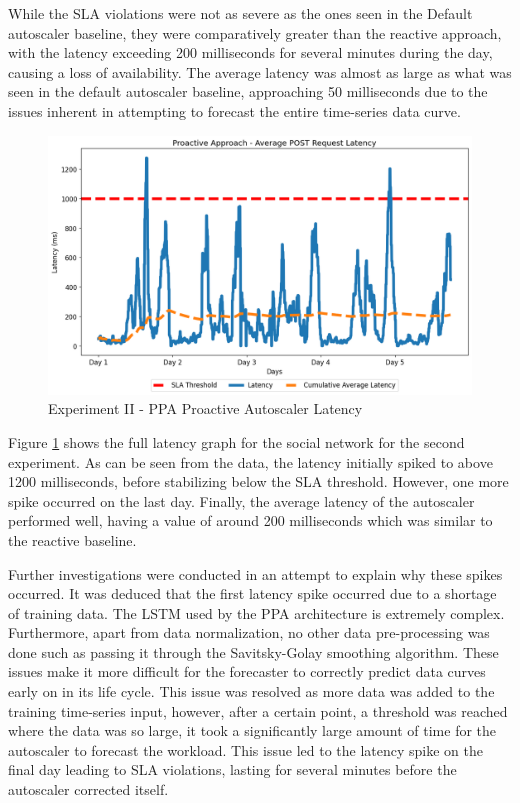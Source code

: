 While the SLA violations were not as severe as the ones seen in the Default autoscaler baseline, they were comparatively greater than the reactive approach, with the latency exceeding 200 milliseconds for several minutes during the day, causing a loss of availability. The average latency was almost as large as what was seen in the default autoscaler baseline, approaching 50 milliseconds due to the issues inherent in attempting to forecast the entire time-series data curve.\par

\begin{figure}[htb]
    \centering
    \caption{Experiment II - PPA Proactive Autoscaler Latency}
    \label{fig:exp2-proactive-k8s}
    \includegraphics[width=0.6\linewidth]{Figures/Compose-Post-Proactive-Latency.png}
\end{figure}

Figure \ref{fig:exp2-proactive-k8s} shows the full latency graph for the social network for the second experiment. As can be seen from the data, the latency initially spiked to above 1200 milliseconds, before stabilizing below the SLA threshold. However, one more spike occurred on the last day. Finally, the average latency of the autoscaler performed well, having a value of around 200 milliseconds which was similar to the reactive baseline.\par

Further investigations were conducted in an attempt to explain why these spikes occurred. It was deduced that the first latency spike occurred due to a shortage of training data. The LSTM used by the PPA architecture is extremely complex. Furthermore, apart from data normalization, no other data pre-processing was done such as passing it through the Savitsky-Golay smoothing algorithm. These issues make it more difficult for the forecaster to correctly predict data curves early on in its life cycle. This issue was resolved as more data was added to the training time-series input, however, after a certain point, a threshold was reached where the data was so large, it took a significantly large amount of time for the autoscaler to forecast the workload. This issue led to the latency spike on the final day leading to SLA violations, lasting for several minutes before the autoscaler corrected itself.\par

